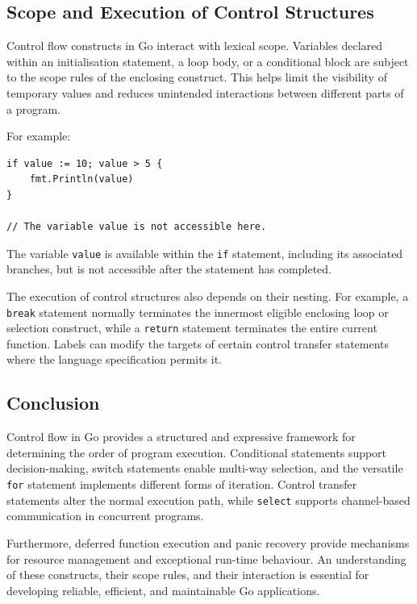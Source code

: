 \subsection{Scope and Execution of Control Structures}

Control flow constructs in Go interact with lexical scope.
Variables declared within an initialisation statement,
a loop body, or a conditional block are subject to the
scope rules of the enclosing construct. This helps limit
the visibility of temporary values and reduces unintended
interactions between different parts of a program.

For example:

\begin{lstlisting}
if value := 10; value > 5 {
    fmt.Println(value)
}

// The variable value is not accessible here.
\end{lstlisting}

The variable \texttt{value} is available within the
\texttt{if} statement, including its associated branches,
but is not accessible after the statement has completed.

The execution of control structures also depends on
their nesting. For example, a \texttt{break} statement
normally terminates the innermost eligible enclosing
loop or selection construct, while a \texttt{return}
statement terminates the entire current function.
Labels can modify the targets of certain control transfer
statements where the language specification permits it.

\subsection{Conclusion}

Control flow in Go provides a structured and expressive
framework for determining the order of program execution.
Conditional statements support decision-making, switch
statements enable multi-way selection, and the versatile
\texttt{for} statement implements different forms of
iteration. Control transfer statements alter the normal
execution path, while \texttt{select} supports channel-based
communication in concurrent programs.

Furthermore, deferred function execution and panic recovery
provide mechanisms for resource management and exceptional
run-time behaviour. An understanding of these constructs,
their scope rules, and their interaction is essential for
developing reliable, efficient, and maintainable Go
applications.